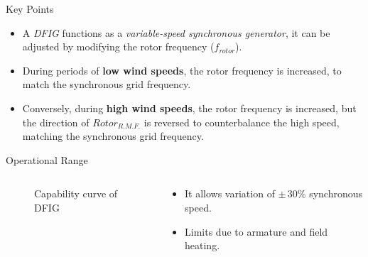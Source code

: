 \documentclass{beamer}
\begin{document}
\begin{frame}{Key Points}
\begin{itemize}
    
    \item A \textit{DFIG} functions as a \textit{variable-speed synchronous generator}, it can be adjusted by modifying the rotor frequency ($f_{\textit{rotor}}$).

    \item During periods of \textbf{low wind speeds}, the rotor frequency is increased, to match the synchronous grid frequency.

    \item Conversely, during \textbf{high wind speeds}, the rotor frequency is increased, but the direction of $Rotor_{R.M.F.}$ is reversed to counterbalance the high speed, matching the synchronous grid frequency. 

\end{itemize}
\end{frame}



\begin{frame}{Operational Range}
 \begin{columns}
\begin{column}{0.5\textwidth} 
    \begin{figure}
        \centering
        \caption{Capability curve of DFIG}
    \end{figure}
    \end{column}
    
    \begin{column}{0.4\textwidth} %
      \begin{itemize}
        \item It allows variation of $\pm \,30\%$ synchronous speed.

        \item Limits due to armature and field heating.
    
      \end{itemize}
    \end{column}
  \end{columns}
\end{frame}
\end{document}
